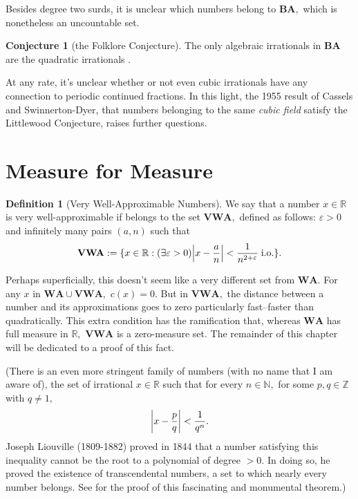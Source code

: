 \documentclass[12pt, letterpaper, oneside]{book}
\renewcommand{\ge}{\ensuremath{\varepsilon}}
\newcommand{\R}{\mathbb{R}}
\newcommand{\N}{\mathbb{N}}
\newcommand{\Z}{\mathbb{Z}}
\DeclarePairedDelimiter{\abs}{\lvert}{\rvert}
\DeclarePairedDelimiter{\set}{\lbrace}{\rbrace}
\theoremstyle{plain}
\theoremstyle{definition}
\newtheorem{definition}{Definition}
\newtheorem{conjecture}{Conjecture}
\theoremstyle{remark}
\begin{document}
Besides degree two surds, it is unclear which numbers belong to $\mathbf{BA},$ which is nonetheless an uncountable set.

\begin{conjecture}[the Folklore Conjecture]
The only algebraic irrationals in $\mathbf{BA}$ are the quadratic irrationals \cite{BRV16}.
\end{conjecture}

At any rate, it's unclear whether or not even cubic irrationals have any connection to periodic continued fractions. In this light, the 1955 result of Cassels and Swinnerton-Dyer, that numbers belonging to the same \textit{cubic field} satisfy the Littlewood Conjecture, raises further questions.  

\section{Measure for Measure}

\begin{definition}[Very Well-Approximable Numbers]
We say that a number $x \in \R$ is very well-approximable if belongs to the set $\mathbf{VWA},$ defined as follows: $\ge > 0$ and infinitely many pairs $(a,n)$ such that
\[
\mathbf{VWA} := \set{x\in\R:(\exists \ge > 0) \abs*{x - \frac{a}{n}} < \frac{1}{n^{2 + \ge}}\;\mbox{i.o.}}.
\]
\end{definition}

Perhaps superficially, this doesn't seem like a very different set from $\mathbf{WA}.$ For any $x$ in $\mathbf{WA}\cup\mathbf{VWA},$ $c(x) = 0.$ But in $\mathbf{VWA},$ the distance between a number and its approximations goes to zero particularly fast--faster than quadratically. This extra condition has the ramification that, whereas $\mathbf{WA}$ has full measure in $\R,$ $\mathbf{VWA}$ is a zero-measure set. The remainder of this chapter will be dedicated to a proof of this fact.

(There is an even more stringent family of numbers (with no name that I am aware of), the set of irrational $x \in \R$ such that for every $n \in \N,$ for some $p,q \in \Z$ with $q \neq 1,$
\[
\abs*{x - \frac{p}{q}} < \frac{1}{q^n}.
\]
Joseph Liouville (1809-1882) proved in 1844 that a number satisfying this inequality cannot be the root to a polynomial of degree $> 0.$ In doing so, he proved the existence of transcendental numbers, a set to which nearly every number belongs.  See \cite{GH60} for the proof of this fascinating and monumental theorem.)
\end{document}
